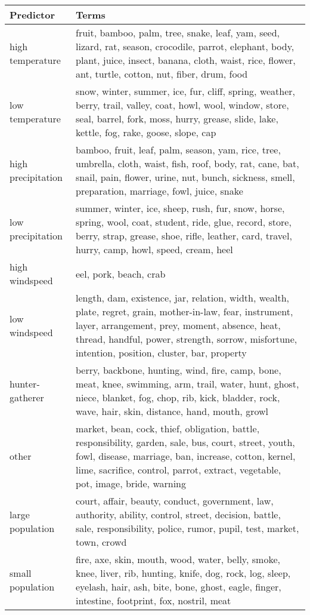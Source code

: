 \begin{table}[ht]
\centering
\begin{tabular}{ll}
  \hline
Predictor & Terms \\ 
  \hline
high temperature & fruit, bamboo, palm, tree, snake, leaf, yam, seed, lizard, rat, season, crocodile, parrot, elephant, body, plant, juice, insect, banana, cloth, waist, rice, flower, ant, turtle, cotton, nut, fiber, drum, food \\ 
  low temperature & snow, winter, summer, ice, fur, cliff, spring, weather, berry, trail, valley, coat, howl, wool, window, store, seal, barrel, fork, moss, hurry, grease, slide, lake, kettle, fog, rake, goose, slope, cap \\ 
  high precipitation & bamboo, fruit, leaf, palm, season, yam, rice, tree, umbrella, cloth, waist, fish, roof, body, rat, cane, bat, snail, pain, flower, urine, nut, bunch, sickness, smell, preparation, marriage, fowl, juice, snake \\ 
  low precipitation & summer, winter, ice, sheep, rush, fur, snow, horse, spring, wool, coat, student, ride, glue, record, store, berry, strap, grease, shoe, rifle, leather, card, travel, hurry, camp, howl, speed, cream, heel \\ 
  high windspeed & eel, pork, beach, crab \\ 
  low windspeed & length, dam, existence, jar, relation, width, wealth, plate, regret, grain, mother-in-law, fear, instrument, layer, arrangement, prey, moment, absence, heat, thread, handful, power, strength, sorrow, misfortune, intention, position, cluster, bar, property \\ 
  hunter-gatherer & berry, backbone, hunting, wind, fire, camp, bone, meat, knee, swimming, arm, trail, water, hunt, ghost, niece, blanket, fog, chop, rib, kick, bladder, rock, wave, hair, skin, distance, hand, mouth, growl \\ 
  other & market, bean, cock, thief, obligation, battle, responsibility, garden, sale, bus, court, street, youth, fowl, disease, marriage, ban, increase, cotton, kernel, lime, sacrifice, control, parrot, extract, vegetable, pot, image, bride, warning \\ 
  large population & court, affair, beauty, conduct, government, law, authority, ability, control, street, decision, battle, sale, responsibility, police, rumor, pupil, test, market, town, crowd \\ 
  small population & fire, axe, skin, mouth, wood, water, belly, smoke, knee, liver, rib, hunting, knife, dog, rock, log, sleep, eyelash, hair, ash, bite, bone, ghost, eagle, finger, intestine, footprint, fox, nostril, meat \\ 
   \hline
\end{tabular}
\end{table}
